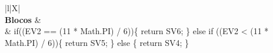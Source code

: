 \begin{xltabular}{\textwidth}{|l|X|}
		 \\ \hline
		\textbf{Blocos} &  \\ \hline
		 & if((EV2 == (11 * Math.PI) / 6))\{   return SV6; \} else if ((EV2 < (11 * Math.PI) / 6))\{   return SV5; \} else \{   return SV4; \} \\ \hline



\end{xltabular}
